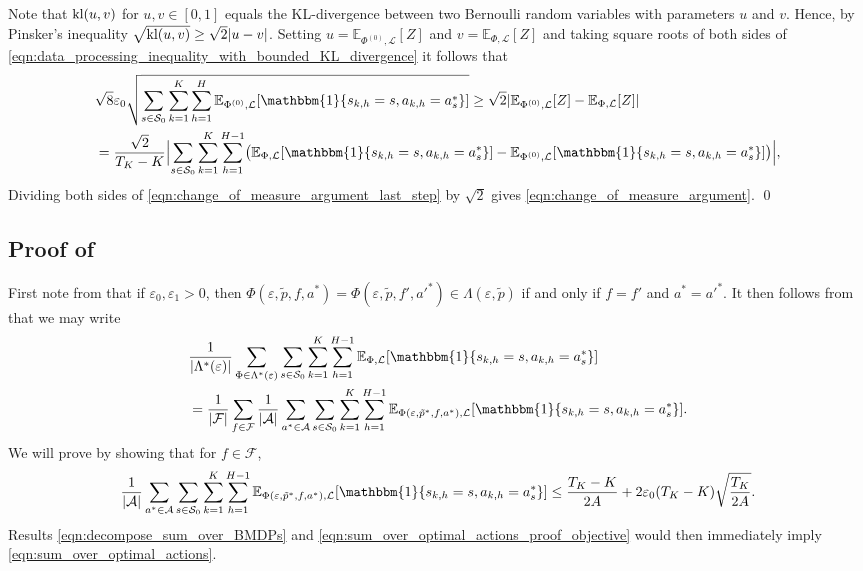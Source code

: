 \documentclass[11pt]{article}
\newcommand{\mcA}{\mathcal{A}}
\newcommand{\mcF}{\mathcal{F}}
\newcommand{\mcL}{\mathcal{L}}
\newcommand{\mcS}{\mathcal{S}}
\newcommand{\mbbE}{\mathbb{E}}
\newcommand{\kl}{\textnormal{kl}}
\theoremstyle{definition}
\theoremstyle{definition}
\begin{document}
Note that $\kl(u,v)$ for $u,v\in[0,1]$ equals the KL-divergence between two Bernoulli random variables with parameters $u$ and $v$.
Hence, by Pinsker's inequality $\sqrt{\kl(u,v)}\geq \sqrt{2}|u-v|$.
Setting $u=\mbbE_{\Phi^{(0)},\mcL}[Z]$ and $v=\mbbE_{\Phi,\mcL}[Z]$ and taking square roots of both sides of \eqref{eqn:data_processing_inequality_with_bounded_KL_divergence} it follows that
\begin{align}
	\label{eqn:change_of_measure_argument_last_step}
	 &
	\sqrt{8}\varepsilon_0
	\sqrt{\sum_{s\in\mcS_0}\sum_{k=1}^K\sum_{h=1}^H\mbbE_{\Phi^{(0)},\mcL}[\mathbbm{1}\{s_{k,h}=s,a_{k,h}=a_s^*\}]}
	\geq
	\sqrt{2}|\mbbE_{\Phi^{(0)},\mcL}[Z]-\mbbE_{\Phi,\mcL}[Z]|
	\\
	 &
	=
	\frac{\sqrt{2}}{T_K-K}
	\Bigl|
	\sum_{s\in\mcS_0}
	\sum_{k=1}^K
	\sum_{h=1}^{H-1}
	\bigl(
	\mbbE_{\Phi,\mcL}
	[\mathbbm{1}\{s_{k,h}=s,
		a_{k,h}=a_s^*\}]
	-
	\mbbE_{\Phi^{(0)},\mcL}[\mathbbm{1}\{s_{k,h}=s,a_{k,h}=a_s^*\}]
	\bigr)
	\Bigr|
	,
	\nonumber
\end{align}
Dividing both sides of \eqref{eqn:change_of_measure_argument_last_step} by $\sqrt{2}$ gives \eqref{eqn:change_of_measure_argument}.
\qed

\subsection{Proof of \texorpdfstring{}{sum over optimal actions bound}}
\label{sec:proof_of_sum_over_optimal_actions}

First note from  that if $\varepsilon_0,\varepsilon_1>0$, then $\Phi(\varepsilon,\tilde{p},f,a^*)= \Phi(\varepsilon,\tilde{p},f',{a'}^*)\in \Lambda(\varepsilon,\tilde{p})$ if and only if $f=f'$ and $a^*={a'}^*$.
It then follows from  that we may write
\begin{equation}
	\label{eqn:decompose_sum_over_BMDPs}
	\begin{split}
		 &
		\frac{1}{|\Lambda^*(\varepsilon)|}
		\sum_{\Phi\in\Lambda^*(\varepsilon)}
		\sum_{s\in\mcS_0}
		\sum_{k=1}^K
		\sum_{h=1}^{H-1}
		\mbbE_{\Phi,\mcL}[\mathbbm{1}\{s_{k,h}=s,a_{k,h}=a_s^*\}]
		\\
		 &
		=
		\frac{1}{|\mcF|}
		\sum_{f\in\mcF}
		\frac{1}{|\mcA|}
		\sum_{a^*\in\mcA}
		\sum_{s\in\mcS_0}
		\sum_{k=1}^K
		\sum_{h=1}^{H-1}
		\mbbE_{\Phi(\varepsilon,\tilde{p}^*,f,a^*),\mcL}[\mathbbm{1}\{s_{k,h}=s,a_{k,h}=a_s^*\}]
		.
	\end{split}
\end{equation}
We will prove  by showing that for $f\in\mcF$,
\begin{equation}
	\label{eqn:sum_over_optimal_actions_proof_objective}
	\frac{1}{|\mcA|}
	\sum_{a^*\in\mcA}
	\sum_{s\in\mcS_0}
	\sum_{k=1}^K
	\sum_{h=1}^{H-1}
	\mbbE_{\Phi(\varepsilon,\tilde{p}^*,f,a^*),\mcL}[\mathbbm{1}\{s_{k,h}=s,a_{k,h}=a_s^*\}]
	\leq
	\frac{T_K-K}{2A}
	+
	2\varepsilon_0(T_K-K)\sqrt{\frac{T_K}{2A}}
	.
\end{equation}
Results \eqref{eqn:decompose_sum_over_BMDPs} and \eqref{eqn:sum_over_optimal_actions_proof_objective} would then immediately imply \eqref{eqn:sum_over_optimal_actions}.
\end{document}
